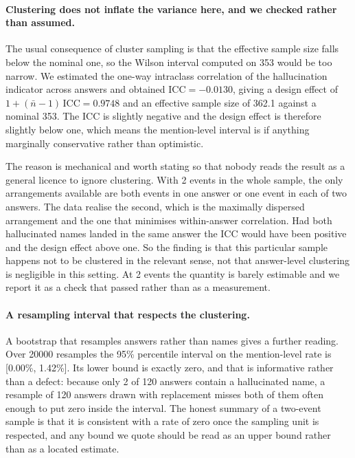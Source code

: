 \documentclass[journal]{IEEEtran}
\theoremstyle{definition}
\newcommand{\Npkg}{353}
\newcommand{\Nhall}{2}
\newcommand{\UNprompt}{120}
\newcommand{\UIcc}{-0.0130}
\newcommand{\UDeff}{0.9748}
\newcommand{\UEss}{362.1}
\newcommand{\UBoot}{20000}
\newcommand{\UCbLo}{0.00}
\newcommand{\UCbHi}{1.42}
\newcommand{\UPrompthit}{2}
\begin{document}
\paragraph{Clustering does not inflate the variance here, and we checked rather
than assumed.} The usual consequence of cluster sampling is that the effective
sample size falls below the nominal one, so the Wilson interval computed on
\Npkg{} would be too narrow. We estimated the one-way intraclass correlation of
the hallucination indicator across answers and obtained
$\mathrm{ICC} = \UIcc$, giving a design effect of
$1 + (\bar{n}-1)\,\mathrm{ICC} = \UDeff$ and an effective sample size of
\UEss{} against a nominal \Npkg{}. The ICC is slightly negative and the design
effect is therefore slightly below one, which means the mention-level interval
is if anything marginally conservative rather than optimistic.

The reason is mechanical and worth stating so that nobody reads the result as a
general licence to ignore clustering. With \Nhall{} events in the whole sample,
the only arrangements available are both events in one answer or one event in
each of two answers. The data realise the second, which is the maximally
dispersed arrangement and the one that minimises within-answer correlation. Had
both hallucinated names landed in the same answer the ICC would have been
positive and the design effect above one. So the finding is that this particular
sample happens not to be clustered in the relevant sense, not that answer-level
clustering is negligible in this setting. At \Nhall{} events the quantity is
barely estimable and we report it as a check that passed rather than as a
measurement.

\paragraph{A resampling interval that respects the clustering.} A bootstrap that
resamples answers rather than names gives a further reading. Over \UBoot{}
resamples the 95\% percentile interval on the mention-level rate is
[\UCbLo\%, \UCbHi\%]. Its lower bound is exactly zero, and that is informative
rather than a defect: because only \UPrompthit{} of \UNprompt{} answers contain
a hallucinated name, a resample of \UNprompt{} answers drawn with replacement
misses both of them often enough to put zero inside the interval. The honest
summary of a two-event sample is that it is consistent with a rate of zero once
the sampling unit is respected, and any bound we quote should be read as an
upper bound rather than as a located estimate.
\end{document}
